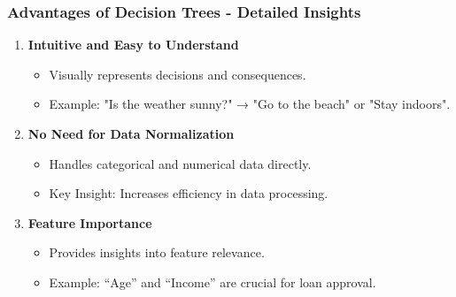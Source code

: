 \documentclass[aspectratio=169]{beamer}
\begin{document}
\begin{frame}[fragile]
    \frametitle{Advantages of Decision Trees - Detailed Insights}
    \begin{enumerate}
        \item \textbf{Intuitive and Easy to Understand}
            \begin{itemize}
                \item Visually represents decisions and consequences.
                \item Example: "Is the weather sunny?" → "Go to the beach" or "Stay indoors".
            \end{itemize}
        
        \item \textbf{No Need for Data Normalization}
            \begin{itemize}
                \item Handles categorical and numerical data directly.
                \item Key Insight: Increases efficiency in data processing.
            \end{itemize}
        
        \item \textbf{Feature Importance}
            \begin{itemize}
                \item Provides insights into feature relevance.
                \item Example: “Age” and “Income” are crucial for loan approval.
            \end{itemize}
    \end{enumerate}
\end{frame}
\end{document}
